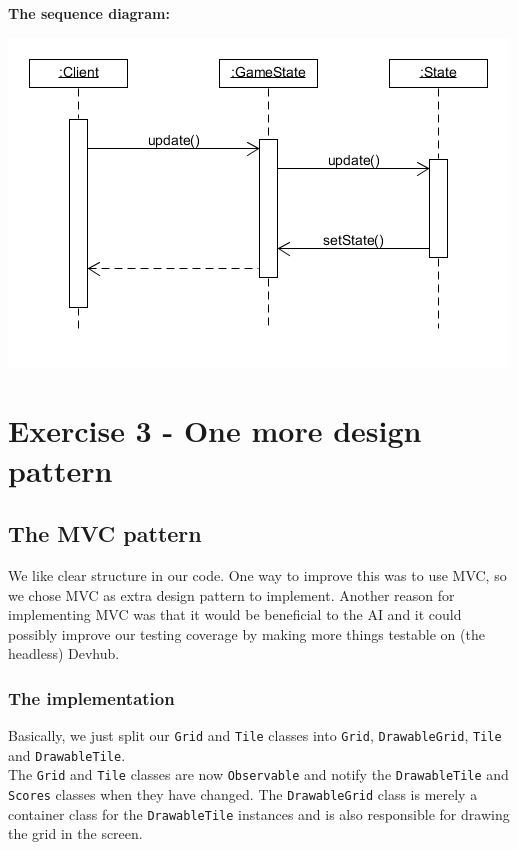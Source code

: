 \documentclass[a4paper,11pt,report]{scrartcl}
\begin{document}
\newpage\textbf{The sequence diagram:}\\
\centerline{\includegraphics[scale=1]{sources/statePatternSequence}}

\newpage\section{Exercise 3 - One more design pattern}
\subsection{The MVC pattern}
We like clear structure in our code. One way to improve this was to use MVC, so
we chose MVC as extra design pattern to implement. Another reason for
implementing MVC was that it would be beneficial to the AI and it could possibly
improve our testing coverage by making more things testable on (the headless)
Devhub.

\subsubsection{The implementation}
Basically, we just split our \texttt{Grid} and \texttt{Tile} classes into
\texttt{Grid}, \texttt{DrawableGrid}, \texttt{Tile} and \texttt{DrawableTile}.\\

The \texttt{Grid} and \texttt{Tile} classes are now \texttt{Observable} and
notify the \texttt{DrawableTile} and \texttt{Scores} classes when they have
changed. The \texttt{DrawableGrid} class is merely a container class for the
\texttt{DrawableTile} instances and is also responsible for drawing the grid in
the screen.\\
\end{document}
